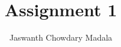 \documentclass[journal,12pt,twocolumn]{IEEEtran}
\begin{document}
\vspace{3cm}


\title{Assignment 1}
\author{Jaswanth Chowdary Madala}





\maketitle

\newpage


\bigskip

\renewcommand{\thefigure}{\theenumi}
\renewcommand{\thetable}{\theenumi}

\begin{enumerate}


\end{enumerate}
\end{document}
